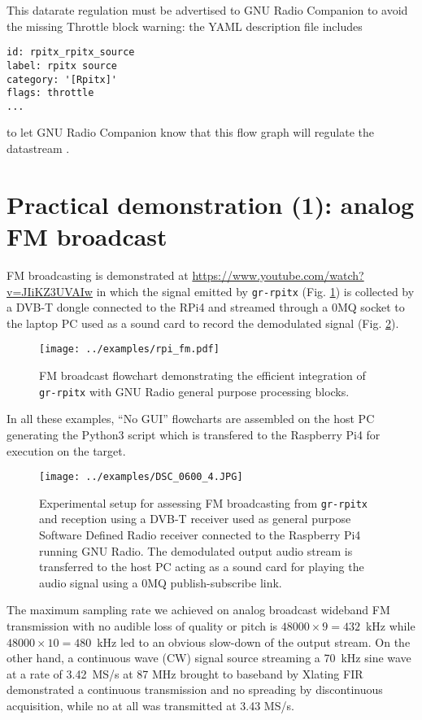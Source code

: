 \documentclass{article}
\begin{document}
This datarate regulation must be advertised to GNU Radio Companion to avoid
the missing Throttle block warning: the YAML description file includes
\begin{verbatim}
id: rpitx_rpitx_source
label: rpitx source
category: '[Rpitx]'
flags: throttle
...
\end{verbatim}
to let GNU Radio Companion know that this flow graph will regulate the
datastream \cite{flag}.

\section{Practical demonstration (1): analog FM broadcast}

FM broadcasting is demonstrated at
\url{https://www.youtube.com/watch?v=JIiKZ3UVAIw} in which the
signal emitted by {\tt gr-rpitx} (Fig. \ref{fm_grc}) is collected by a DVB-T dongle
connected to the RPi4 and streamed through a 0MQ socket to the
laptop PC used as a sound card to record the demodulated signal (Fig. \ref{fm}).

\begin{figure}[h!tb]
\texttt{[image: ../examples/rpi\_fm.pdf]}
\caption{FM broadcast flowchart demonstrating the efficient integration of {\tt gr-rpitx}
with GNU Radio general purpose processing blocks.}
\label{fm_grc}
\end{figure}

In all these examples, ``No GUI'' flowcharts are assembled on the host PC generating 
the Python3 script which is transfered to the Raspberry Pi4 for execution on the target.

\begin{figure}[h!tb]
\texttt{[image: ../examples/DSC\_0600\_4.JPG]}
\caption{Experimental setup for assessing FM broadcasting from {\tt gr-rpitx}
and reception using a DVB-T receiver used as general purpose Software Defined Radio
receiver connected to the Raspberry Pi4 running GNU Radio. The demodulated output
audio stream is transferred to the host PC acting as a sound card for playing the
audio signal using a 0MQ publish-subscribe link.}
\label{fm}
\end{figure}

The maximum sampling rate we achieved on analog broadcast wideband FM 
transmission with no audible loss of quality or pitch is $48000\times 9=432$~kHz
while $48000\times 10=480$~kHz led to an obvious slow-down of the output stream.
On the other hand, a continuous wave (CW) signal source streaming a 70~kHz sine
wave at a rate of 3.42~MS/s at 87 MHz brought to baseband by Xlating FIR
demonstrated a continuous transmission and no spreading by discontinuous
acquisition, while no at all was transmitted at 3.43 MS/s. 
\end{document}
